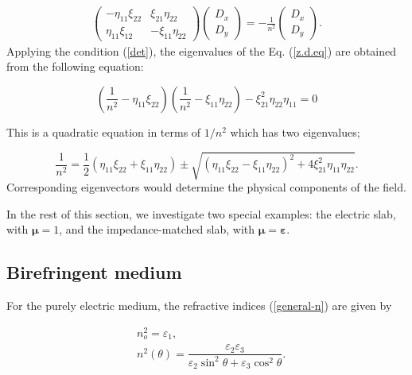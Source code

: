 \documentclass[9pt,twocolumn,twoside]{osajnl}
\begin{document}
\begin{eqnarray}\label{z.d.eq}
        \begin{pmatrix}
            - \eta_{11} \xi_{22}  & \xi_{21}\eta_{22} \\
             \eta_{11} \xi_{12}& -\xi_{11}\eta_{22}
        \end{pmatrix}
        \begin{pmatrix}
            D_{x} \\ D_{y}
        \end{pmatrix}
        = -\frac{1}{n^{2}}
        \begin{pmatrix}
            D_{x} \\ D_{y}
        \end{pmatrix}.
\end{eqnarray}
Applying the condition (\ref{det}), the eigenvalues of the Eq. (\ref{z.d.eq}) are obtained from the following equation:

\begin{equation}\label{gn}
 \left( \dfrac{1}{n^2}- \eta_{11} \xi_{22}\right)\left(\dfrac{1}{n^2}-\xi_{11}\eta_{22}\right)-\xi_{21}^{2}\eta_{22}\eta_{11}=0
\end{equation}

This is a quadratic equation in terms of $1/n^2$ which has two eigenvalues;

\begin{equation}\label{general-n}
\dfrac{1}{n^2}=\dfrac{1}{2} \left( \eta_{11} \xi_{22}+\xi_{11}\eta_{22}\right)\pm \sqrt{\left(\eta_{11} \xi_{22}-\xi_{11}\eta_{22}\right)^{2}+4\xi_{21}^{2}\eta_{11}\eta_{22}}.
\end{equation}
Corresponding eigenvectors would determine the physical components of the field. 

In the rest of this section, we investigate two special examples: the electric slab, with $\boldsymbol \mu=1$, and the impedance-matched slab, with $\boldsymbol \mu = \boldsymbol \varepsilon $. 

\subsection{Birefringent medium}\label{electric anisotropic}

For the purely electric medium, the refractive indices (\ref{general-n}) are given by

\begin{eqnarray}
        &n_{o}^2=\varepsilon_{1} \label{n1},\\
        &n^{2}(\theta)=\dfrac{\varepsilon_{2}\varepsilon_{3}}{\varepsilon_{2}\sin^{2}{\theta}+\varepsilon_{3}\cos^{2}{\theta}} \label{n2}.
\end{eqnarray}    
\end{document}
